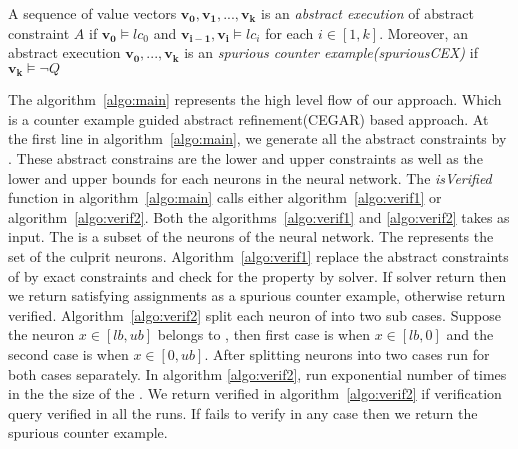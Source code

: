 \begin{df}
  A sequence of value vectors $\boldsymbol{v_0}, \boldsymbol{v_1}, ... , \boldsymbol{v_k}$ is an 
  {\em abstract execution} of abstract constraint $A$ if 
  $\boldsymbol{v_0} \models lc_0$ and $\boldsymbol{v_{i-1}}, \boldsymbol{v_i} \models lc_i$ for each $i \in [1,k]$.  
 Moreover, an abstract execution $\boldsymbol{v_0,...,v_k}$ is
  an {\em spurious counter example(spuriousCEX)} if $\boldsymbol{v_k} \models \lnot Q$
\end{df}










The algorithm~\ref{algo:main} represents the high level flow of our approach. Which is a counter example guided abstract refinement(CEGAR) based approach. 
At the first line in algorithm~\ref{algo:main}, we generate all the abstract constraints by \deeppoly{}. These abstract constrains
are the lower and upper constraints as well as the lower and upper bounds for each neurons in the neural network.
The \emph{isVerified} function in algorithm~\ref{algo:main} calls either algorithm~\ref{algo:verif1} or algorithm~\ref{algo:verif2}. 
Both the algorithms~\ref{algo:verif1} and \ref{algo:verif2} takes \markednewrons{} as input. The \markednewrons{} 
is a subset of the neurons of the neural network. The \markednewrons{} represents the set of the culprit neurons. 
Algorithm~\ref{algo:verif1} replace the abstract constraints of \markednewrons{} by exact constraints and check for the 
property by \milp{} solver. If \milp{} solver return \sat{} then we return satisfying assignments as a spurious counter example, 
otherwise return verified. Algorithm~\ref{algo:verif2} split each neuron of \markednewrons{} into two sub cases. Suppose the 
neuron $x\in [lb,ub]$ belongs to \markednewrons{}, then first case is when $x \in [lb,0]$ and the second case is when $x \in [0,ub]$.   
After splitting neurons into two cases \deeppoly{} run for both cases separately. In algorithm \ref{algo:verif2}, \deeppoly{}
run exponential number of times in the the size of the \markednewrons{}. We return verified in algorithm~\ref{algo:verif2} if 
verification query verified in all the \deeppoly{} runs. If \deeppoly{} fails to verify in any case then we return the spurious counter example. 


